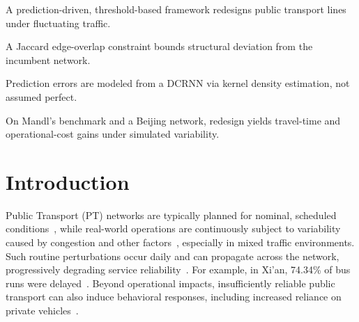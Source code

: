 \documentclass[a4paper,fleqn]{cas-sc}
\begin{document}

\begin{highlights}
\item A prediction-driven, threshold-based framework redesigns public transport lines under fluctuating traffic.
\item A Jaccard edge-overlap constraint bounds structural deviation from the incumbent network.
\item Prediction errors are modeled from a DCRNN via kernel density estimation, not assumed perfect.
\item On Mandl's benchmark and a Beijing network, redesign yields travel-time and operational-cost gains under simulated variability.
\end{highlights}


\begin{keywords}
\end{keywords}

\maketitle

\section{Introduction}

Public Transport (PT) networks are typically planned for nominal, scheduled conditions~\citep{ibarra2015planning}, while real-world operations are continuously subject to variability caused by congestion and other factors~\citep{buchel2020review, danaher2020minutes}, especially in mixed traffic environments. Such routine perturbations occur daily and can propagate across the network, progressively degrading service reliability~\citep{marra2020delay}. For example, in Xi’an, 74.34\% of bus runs were delayed~\citep{zhang2022travel}. 
Beyond operational impacts, insufficiently reliable public transport can also induce behavioral responses, including increased reliance on private vehicles~\citep{rodier2025evaluation}.
\end{document}
